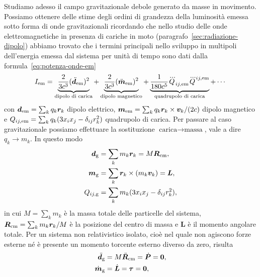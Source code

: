 Studiamo adesso il campo gravitazionale debole generato da masse in movimento.
Possiamo ottenere delle stime degli ordini di grandezza della luminosità emessa
sotto forma di onde gravitazionali ricordando che nello studio delle onde
elettromagnetiche in presenza di cariche in moto
(paragrafo~\ref{sec:radiazione-dipolo}) abbiamo trovato che i termini principali
nello sviluppo in multipoli dell'energia emessa dal sistema per unità di tempo
sono dati dalla formula~\eqref{eq:potenza-onde-em}
\begin{equation}
  I_{\textup{em}} = \underbrace{\frac{2}{3c^{3}}
    (\ddot{\bm{d}}_{\textup{em}})^{2}}_{\text{dipolo di carica}} +
  \underbrace{\frac{2}{3c^{3}} (\ddot{\bm{m}}_{\textup{em}})^{2}}_{\text{dipolo
      magnetico}} +
  \underbrace{\frac{1}{180c^{5}}
    \dddot{Q}_{ij,\textup{em}}\dddot{Q}^{ij,\textup{em}}}_{\text{quadrupolo di
      carica}} + \cdots
\end{equation}
con $\bm{d}_{\textup{em}} = \sum_{k} q_{k} \bm{r}_{k}$ dipolo elettrico,
$\bm{m}_{\textup{em}} = \sum_{k} q_{k} \bm{r}_{k} \times \bm{v}_{k}/(2c)$ dipolo
magnetico e $Q_{ij,\textup{em}} = \sum_{k} q_{k}(3x_{i}x_{j}
-\delta_{ij}r_{k}^{2})$ quadrupolo di carica.  Per passare al caso
gravitazionale possiamo effettuare la sostituzione $\text{carica} \to
\text{massa}$, vale a dire $q_{k} \to m_{k}$.  In questo modo
\begin{subequations}
  \begin{align}
    \bm{d}_{\textup{g}} &= \sum_{k} m_{k} \bm{r}_{k} = M \bm{R}_{\textup{cm}},\\
    \bm{m}_{\textup{g}} &= \sum_{k} \bm{r}_{k} \times (m_{k} \bm{v}_{k}) =
                          \bm{L}, \\
    Q_{ij,\textup{g}} &= \sum_{k} m_{k}(3x_{i}x_{j} -\delta_{ij}r_{k}^{2}),
  \end{align}
\end{subequations}
in cui $M = \sum_{k} m_{k}$ è la massa totale delle particelle del sistema,
$\bm{R}_{\textup{cm}} = \sum_{k} m_{k} \bm{r}_{k}/M$ è la posizione del centro
di massa e $\bm{L}$ è il momento angolare totale.  Per un sistema non
relativistico isolato, cioè nel quale non agiscono forze esterne né è presente
un momento torcente esterno diverso da zero, risulta
\begin{subequations}
  \begin{align}
    \ddot{\bm{d}}_{\textup{g}} &= M \ddot{\bm{R}}_{\textup{cm}} =
    \dot{\bm{P}} = \bm{0}, \\
    \dot{\bm{m}}_{\textup{g}} &= \dot{\bm{L}} = \bm{\tau} = \bm{0},
  \end{align}
\end{subequations}

